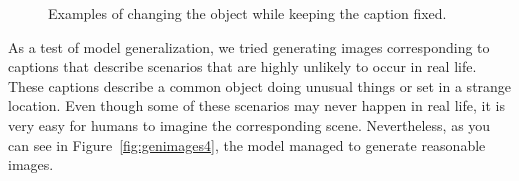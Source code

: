 \documentclass{article} %
\begin{document}
\begin{figure}[!h]
\captionsetup[subfigure]{labelformat=empty}
\vspace{-0.3cm}
\begin{center}
\quad
%
\quad
%
\quad
%
\quad
%
\end{center}
\caption{Examples of changing the object while keeping the caption fixed.}
\label{fig:genimages3}
\vspace{-0.3cm}
\end{figure}

As a test of model generalization, we tried generating images corresponding to captions that describe scenarios that are highly unlikely to occur in real life. These captions describe a common object doing unusual things 
or set in a strange location.
Even though some of these scenarios may never happen in real life, it is very easy for humans to imagine the corresponding scene. Nevertheless, as you can see in Figure~\ref{fig:genimages4}, the model managed to generate reasonable images.  
\end{document}
